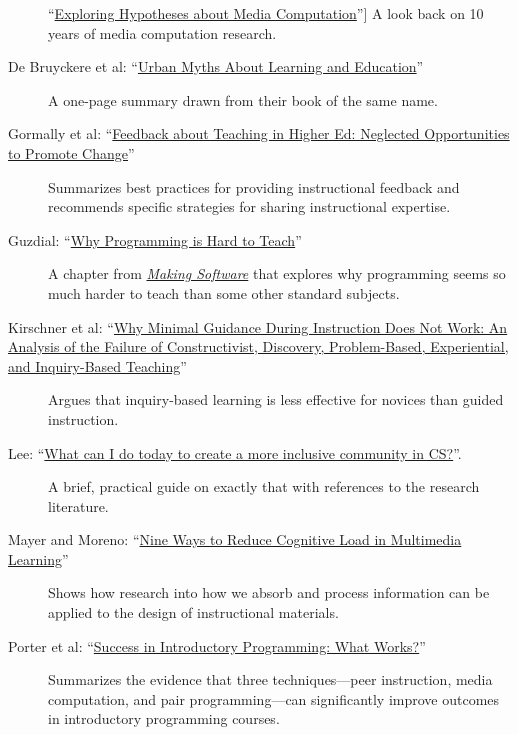 \begin{description}
``\href{\{\{\%20page.root\%20\}\}/files/papers/guzdial-mediacomp-retrospective-2013.pdf}{Exploring
Hypotheses about Media Computation}'']
A look back on 10 years of media computation research.
\item[De Bruyckere et al:
``\href{\{\{\%20page.root\%20\}\}/files/papers/de-bruyckere-urban-myths-2015.pdf}{Urban
Myths About Learning and Education}'']
A one-page summary drawn from their book of the same name.
\item[Gormally et al:
``\href{\{\{\%20page.root\%20\}\}/files/papers/gormally-teaching-feedback-2014.pdf}{Feedback
about Teaching in Higher Ed: Neglected Opportunities to Promote
Change}'']
Summarizes best practices for providing instructional feedback and
recommends specific strategies for sharing instructional expertise.
\item[Guzdial:
``\href{\{\{\%20page.root\%20\}\}/files/papers/guzdial-why-hard-to-teach-2011.pdf}{Why
Programming is Hard to Teach}'']
A chapter from
\emph{\href{http://www.amazon.com/Making-Software-Really-Works-Believe/dp/0596808321/}{Making
Software}} that explores why programming seems so much harder to teach
than some other standard subjects.
\item[Kirschner et al:
``\href{\{\{\%20page.root\%20\}\}/files/papers/kirschner-minimal-guidance-fails-2006.pdf}{Why
Minimal Guidance During Instruction Does Not Work: An Analysis of the
Failure of Constructivist, Discovery, Problem-Based, Experiential, and
Inquiry-Based Teaching}'']
Argues that inquiry-based learning is less effective for novices than
guided instruction.
\item[Lee:
``\href{\{\{\%20page.root\%20\}\}/files/papers/lee-create-inclusive-community-2015.pdf}{What
can I do today to create a more inclusive community in CS?}''.]
A brief, practical guide on exactly that with references to the research
literature.
\item[Mayer and Moreno:
``\href{\{\{\%20page.root\%20\}\}/files/papers/mayer-reduce-cognitive-load-2003.pdf}{Nine
Ways to Reduce Cognitive Load in Multimedia Learning}'']
Shows how research into how we absorb and process information can be
applied to the design of instructional materials.
\item[Porter et al:
``\href{\{\{\%20page.root\%20\}\}/files/papers/porter-what-works-2013.pdf}{Success
in Introductory Programming: What Works?}'']
Summarizes the evidence that three techniques---peer instruction, media
computation, and pair programming---can significantly improve outcomes
in introductory programming courses.

\end{description}

